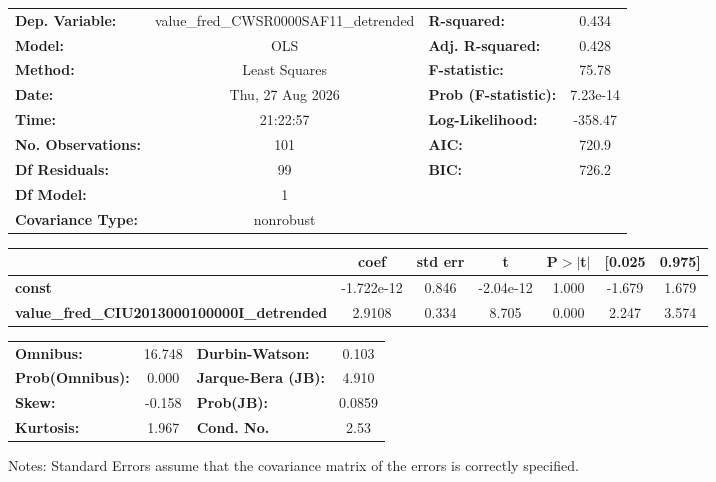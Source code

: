 \begin{center}
\begin{tabular}{lclc}
\toprule
\textbf{Dep. Variable:}                            & value\_fred\_CWSR0000SAF11\_detrended & \textbf{  R-squared:         } &     0.434   \\
\textbf{Model:}                                    &                  OLS                  & \textbf{  Adj. R-squared:    } &     0.428   \\
\textbf{Method:}                                   &             Least Squares             & \textbf{  F-statistic:       } &     75.78   \\
\textbf{Date:}                                     &            Thu, 27 Aug 2026           & \textbf{  Prob (F-statistic):} &  7.23e-14   \\
\textbf{Time:}                                     &                21:22:57               & \textbf{  Log-Likelihood:    } &   -358.47   \\
\textbf{No. Observations:}                         &                    101                & \textbf{  AIC:               } &     720.9   \\
\textbf{Df Residuals:}                             &                     99                & \textbf{  BIC:               } &     726.2   \\
\textbf{Df Model:}                                 &                      1                & \textbf{                     } &             \\
\textbf{Covariance Type:}                          &               nonrobust               & \textbf{                     } &             \\
\bottomrule
\end{tabular}
\begin{tabular}{lcccccc}
                                                   & \textbf{coef} & \textbf{std err} & \textbf{t} & \textbf{P$> |$t$|$} & \textbf{[0.025} & \textbf{0.975]}  \\
\midrule
\textbf{const}                                     &   -1.722e-12  &        0.846     & -2.04e-12  &         1.000        &       -1.679    &        1.679     \\
\textbf{value\_fred\_CIU2013000100000I\_detrended} &       2.9108  &        0.334     &     8.705  &         0.000        &        2.247    &        3.574     \\
\bottomrule
\end{tabular}
\begin{tabular}{lclc}
\textbf{Omnibus:}       & 16.748 & \textbf{  Durbin-Watson:     } &    0.103  \\
\textbf{Prob(Omnibus):} &  0.000 & \textbf{  Jarque-Bera (JB):  } &    4.910  \\
\textbf{Skew:}          & -0.158 & \textbf{  Prob(JB):          } &   0.0859  \\
\textbf{Kurtosis:}      &  1.967 & \textbf{  Cond. No.          } &     2.53  \\
\bottomrule
\end{tabular}
\end{center}

Notes: \newline
 [1] Standard Errors assume that the covariance matrix of the errors is correctly specified.
